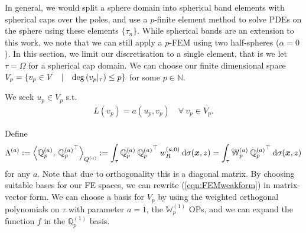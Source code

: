 \documentclass[11pt, oneside]{article}   	%
\newcommand{\N}{\mathbb{N}}
\newcommand{\genjac}{R}
\newcommand{\genjacw}{w_\genjac}
\newcommand{\element}{\tau}
\newcommand{\bigW}{\mathbb{W}}
\newcommand{\scop}{Q}
\newcommand{\scopa}{\scop^{(a)}}
\newcommand{\bigscop}{{\mathbb{Q}}}
\newcommand{\bigscopa}{\bigscop^{(a)}}
\newcommand{\bigscopi}{\bigscop^{(1)}}
\begin{document}
In general, we would split a sphere domain into spherical band elements with spherical caps over the poles, and use a $p$-finite element method to solve PDEs on the sphere using these elements $\{\element_n\}$. While spherical bands are an extension to this work, we note that we can still apply a $p$-FEM using two half-spheres ($\alpha = 0$). In this section, we limit our discretisation to a single element, that is we let $\element = \Omega$ for a spherical cap domain. We can choose our finite dimensional space $V_p = \{v_p \in V \quad | \quad {\rm deg}\,(v_p \rvert_\element) \le p\}$ for some $p \in \N$.

We seek $u_p \in V_p$ s.t.
\begin{align}
	L(v_p) = a(u_p,v_p) \quad \forall \: v_p \in V_p.
	\label{eqn:FEMweakform}
\end{align}

Define 
\begin{align*}
	\Lambda^{(a)} :=  \ip< \bigscopa_p, \: {\bigscopa_p}^\top >_{\scopa} := \int_\element \bigscopa_p \: {\bigscopa_p}^\top \: \genjacw^{(a,0)} \: \D \sigma(\bm{x}, z) = \int_\element \bigW_p^{(a)} \: {\bigscopa_p}^\top \: \D \sigma(\bm{x}, z)
\end{align*}
for any $a$. Note that due to orthogonality this is a diagonal matrix. By choosing suitable bases for our FE spaces, we can rewrite (\ref{eqn:FEMweakform}) in matrix-vector form. We can choose a basis for $V_p$ by using the weighted orthogonal polynomials on $\element$ with parameter $a = 1$, the $\bigW_p^{(1)}$ OPs, and we can expand the function $f$ in the $\bigscopi_p$ basis. 
\end{document}
